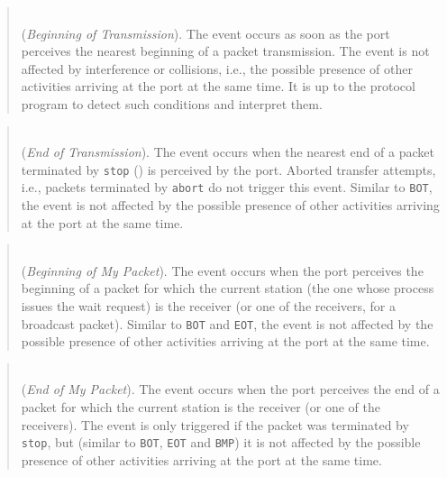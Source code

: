 \begin{quote}
\noindent{}\\ \hspace{0in}
({\em Beginning of Transmission\/}).
The event occurs as soon as the port perceives the nearest beginning of
a packet transmission.
The event is not affected by interference or collisions, i.e.,
the possible presence of other activities arriving at the port at the same
time.
It is up to the protocol program to detect such conditions and interpret
them.
\end{quote}

\begin{quote}
\noindent{}\\ \hspace{0in}
({\em End of Transmission\/}).
The event occurs when the nearest end of a packet terminated by
{\tt stop} () is perceived by the port.
Aborted transfer attempts, i.e., packets terminated by {\tt abort}
do not trigger this event.
Similar to {\tt BOT},
the event is not affected by
the possible presence of other activities arriving at the port at the same
time.
\end{quote}

\begin{quote}
\noindent{}\\ \hspace{0in}
({\em Beginning of My Packet\/}).
The event occurs when the port perceives the beginning of a packet for
which the current station (the one whose process issues the wait request)
is the receiver (or one of the receivers, for a broadcast packet).
Similar to {\tt BOT} and {\tt EOT},
the event is not affected by
the possible presence of other activities arriving at the port at the same
time.
\end{quote}

\begin{quote}
\noindent{}\\ \hspace{0in}
({\em End of My Packet\/}).
The event occurs when the port perceives the end of a packet for which
the current station is the receiver (or one of the receivers).
The event is only triggered if the packet was terminated by {\tt stop},
but (similar to {\tt BOT}, {\tt EOT} and {\tt BMP})
it is not affected by
the possible presence of other activities arriving at the port at the same
time.
\end{quote}

